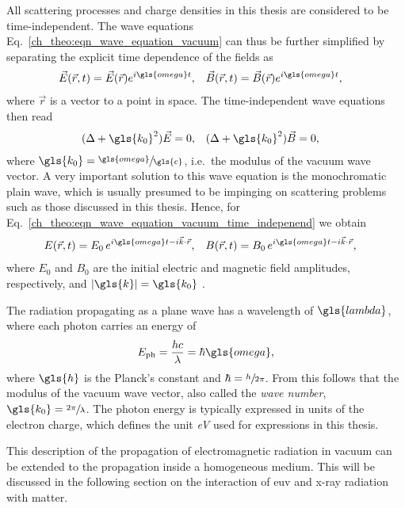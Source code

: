 All scattering processes and charge densities in this thesis are considered to be time-independent. The wave equations Eq.~\eqref{ch_theo:eqn_wave_equation_vacuum} can thus be further simplified by separating the explicit time dependence of the fields as
\begin{align}
\vec{E}(\vec{r},t) &= \vec{E}(\vec{r}) e^{i \gls{omega} t}\text{,} & \vec{B}(\vec{r},t) &= \vec{B}(\vec{r}) e^{i \gls{omega} t}\text{,}
\end{align}
where $\vec{r}$ is a vector to a point in space. The time-independent wave equations then read
\begin{align}
(\Delta  + \gls{k_0}^2 ) \vec{E} &= 0\text{,}& (\Delta  + \gls{k_0}^2 ) \vec{B} &= 0\text{,} \label{ch_theo:eqn_wave_equation_vacuum_time_indepenend}
\end{align}
where $\gls{k_0}= \sfrac{\gls{omega}}{\gls{c}}$, i.e.~the modulus of the vacuum wave vector. A very important solution to this wave equation is the monochromatic plain wave, which is usually presumed to be impinging on scattering problems such as those discussed in this thesis. Hence, for Eq.~\eqref{ch_theo:eqn_wave_equation_vacuum_time_indepenend} we obtain
\begin{align}
E(\vec{r},t) &= E_0 \, e^{i \gls{omega} t - i \vec{k} \cdot \vec{r}}\text{,} & B(\vec{r},t) &= B_0 \, e^{i \gls{omega} t - i \vec{k} \cdot \vec{r}}\text{,} \label{ch_theo:eqn_plain_wave}
\end{align}
where $E_0$ and $B_0$ are the initial electric and magnetic field amplitudes, respectively, and $|\gls{k}| = \gls{k_0}$ \cite{born_principles_1965}.

The radiation propagating as a plane wave has a wavelength of $\gls{lambda}$, where each photon carries an energy of
\begin{align}
E_\text{ph} = \frac{h c}{\lambda} = \hbar \gls{omega}\text{,}
\end{align}
where $\gls{h}$ is the Planck's constant and $\hbar = \sfrac{h}{2 \pi}$. From this follows that the modulus of the vacuum wave vector, also called the \emph{wave number}, $\gls{k_0} = \sfrac{2 \pi}{\lambda}$. The photon energy is typically expressed in units of the electron charge, which defines the unit \emph{\gls{eV}} used for expressions in this thesis.

This description of the propagation of electromagnetic radiation in vacuum can be extended to the propagation inside a homogeneous medium. This will be discussed in the following section on the interaction of \gls{euv} and x-ray radiation with matter.

